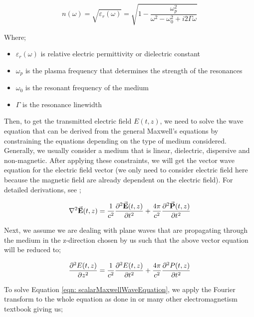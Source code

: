 \begin{equation}
    n(\omega) = \sqrt{\varepsilon_{r}(\omega)} = \sqrt{1 - \frac{\omega_{p}^{2}}{\omega^{2} - \omega_{0}^{2} + i2\Gamma\omega}}
    \label{eqn: nw}
\end{equation}

\newpage

Where;

\begin{itemize}
    \item $\varepsilon_{r}(\omega)$ is relative electric permittivity or dielectric constant
    \item $\omega_{p}$ is the plasma frequency that determines the strength of the resonances
    \item $\omega_{0}$ is the resonant frequency of the medium
    \item $\Gamma$ is the resonance linewidth
\end{itemize}

Then, to get the transmitted electric field $E(t, z)$, we need to solve the wave equation that can be derived from the general Maxwell's equations by constraining the equations depending on the type of medium considered. Generally, we usually consider a medium that is linear, dielectric, dispersive and non-magnetic. After applying these constraints, we will get the vector wave equation for the electric field vector (we only need to consider electric field here because the magnetic field are already dependent on the electric field). For detailed derivations, see \cite{jackson1999classical};

\begin{equation}
    \laplacian{\va{E}(t, z)} = \frac{1}{c^2} \pdv[2]{\va{E}(t, z)}{t} + \frac{4\pi}{c^2} \pdv[2]{\va{P}(t, z)}{t}
\end{equation}

Next, we assume we are dealing with plane waves that are propagating through the medium in the z-direction chosen by us such that the above vector equation will be reduced to;

\begin{equation}
    \pdv[2]{E(t, z)}{z} = \frac{1}{c^2} \pdv[2]{E(t, z)}{t} + \frac{4\pi}{c^2} \pdv[2]{P(t, z)}{t}
    \label{eqn: scalarMaxwellWaveEquation}
\end{equation}

\newpage

To solve Equation \ref{eqn: scalarMaxwellWaveEquation}, we apply the Fourier transform to the whole equation as done in \cite{jackson1999classical} or many other electromagnetism textbook giving us;

